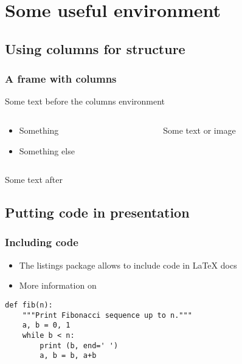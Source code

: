 \documentclass[10pt,hidelinks]{beamer}
\newcommand{\colorhref}[2]{\href{#1}{\color{bleublason}{#2}}}
\begin{document}
\section{Some useful environment}

\subsection{Using columns for structure}

\begin{frame}
  \frametitle{A frame with columns}

  Some text before the columns environment

  \vfill

  \begin{columns}
    \begin{column}{0.5\linewidth}
      \begin{itemize}
      \item Something
      \item Something else
      \end{itemize}
    \end{column}
    \begin{column}{0.5\linewidth}
      Some text or image

      \begin{center}
      \end{center}
    \end{column}
  \end{columns}

  \vfill

    Some text after
\end{frame}

\subsection{Putting code in presentation}

\begin{frame}[fragile]
  \frametitle{Including code}

  \begin{itemize}
  \item   The listings package allows to include code in \LaTeX{} docs
  \item More information on \colorhref{https://www.ctan.org/pkg/listings}{https://www.ctan.org/pkg/listings}
  \end{itemize}

  \vfill

\begin{lstlisting}
def fib(n):
    """Print Fibonacci sequence up to n."""
    a, b = 0, 1
    while b < n:
        print (b, end=' ')
        a, b = b, a+b
\end{lstlisting}

\end{frame}
\end{document}

